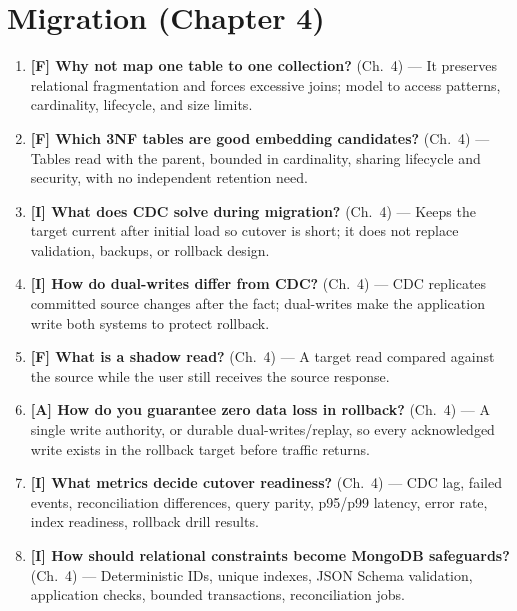 \section{Migration (Chapter 4)}
\begin{enumerate}
    \item \textbf{[F] Why not map one table to one collection?} (Ch.~4) --- It preserves relational fragmentation and forces excessive joins; model to access patterns, cardinality, lifecycle, and size limits.
    \item \textbf{[F] Which 3NF tables are good embedding candidates?} (Ch.~4) --- Tables read with the parent, bounded in cardinality, sharing lifecycle and security, with no independent retention need.
    \item \textbf{[I] What does CDC solve during migration?} (Ch.~4) --- Keeps the target current after initial load so cutover is short; it does not replace validation, backups, or rollback design.
    \item \textbf{[I] How do dual-writes differ from CDC?} (Ch.~4) --- CDC replicates committed source changes after the fact; dual-writes make the application write both systems to protect rollback.
    \item \textbf{[F] What is a shadow read?} (Ch.~4) --- A target read compared against the source while the user still receives the source response.
    \item \textbf{[A] How do you guarantee zero data loss in rollback?} (Ch.~4) --- A single write authority, or durable dual-writes/replay, so every acknowledged write exists in the rollback target before traffic returns.
    \item \textbf{[I] What metrics decide cutover readiness?} (Ch.~4) --- CDC lag, failed events, reconciliation differences, query parity, p95/p99 latency, error rate, index readiness, rollback drill results.
    \item \textbf{[I] How should relational constraints become MongoDB safeguards?} (Ch.~4) --- Deterministic IDs, unique indexes, JSON Schema validation, application checks, bounded transactions, reconciliation jobs.
\end{enumerate}


